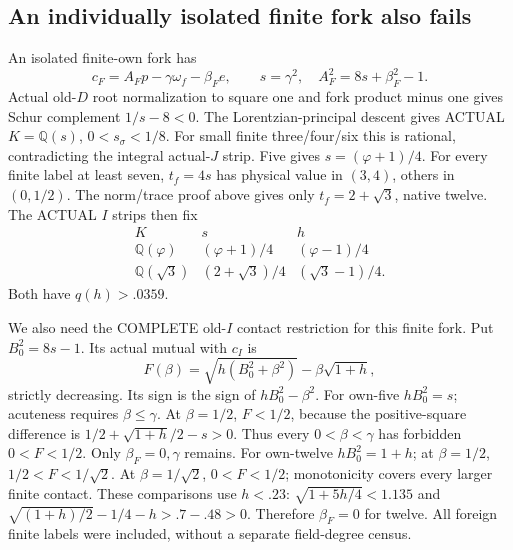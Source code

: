 \subsection{An individually isolated finite fork also fails}
\label{app:arithD16Ifiniteisolated}

An isolated finite-own fork has
\[
       c_F=A_Fp-\gamma\omega_f-\beta_Fe,\qquad
       s=\gamma^2,\quad A_F^2=8s+\beta_F^2-1 .
\]
Actual old-\(D\) root normalization
to square one and fork product minus
one gives Schur complement \(1/s-8<0\).
The Lorentzian-principal descent gives
ACTUAL \(K=\mathbb Q(s)\),
\(0<s_\sigma<1/8\).
For small finite three/four/six this
is rational, contradicting the integral
actual-\(J\) strip.
Five gives \(s=(\varphi+1)/4\).
For every finite label at least seven,
\(t_f=4s\) has physical value in
\((3,4)\), others in \((0,1/2)\).
The norm/trace proof above gives only
\(t_f=2+\sqrt3\), native twelve.
The ACTUAL \(I\) strips then fix
\[
\begin{array}{c|c|c}
 K&s&h\\ \hline
 \mathbb Q(\varphi)&(\varphi+1)/4&(\varphi-1)/4\\
 \mathbb Q(\sqrt3)&(2+\sqrt3)/4&(\sqrt3-1)/4 .
\end{array}
\]
Both have \(q(h)>.0359\).

We also need the COMPLETE old-\(I\)
contact restriction for this finite fork.
Put \(B_0^2=8s-1\).
Its actual mutual with \(c_I\) is
\[
                 F(\beta)=\sqrt{h(B_0^2+\beta^2)}
                                          -\beta\sqrt{1+h},
\]
strictly decreasing.
Its sign is the sign of
\(hB_0^2-\beta^2\).
For own-five \(hB_0^2=s\);
acuteness requires \(\beta\le\gamma\).
At \(\beta=1/2\),
\(F<1/2\), because the positive-square
difference is
\(1/2+\sqrt{1+h}/2-s>0\).
Thus every \(0<\beta<\gamma\) has
forbidden \(0<F<1/2\).
Only \(\beta_F=0,\gamma\) remains.
For own-twelve \(hB_0^2=1+h\);
at \(\beta=1/2\), \(1/2<F<1/\sqrt2\).
At \(\beta=1/\sqrt2\), \(0<F<1/2\);
monotonicity covers every larger finite
contact.
These comparisons use \(h<.23\):
\(\sqrt{1+5h/4}<1.135\) and
\(\sqrt{(1+h)/2}-1/4-h>.7-.48>0\).
Therefore \(\beta_F=0\) for twelve.
All foreign finite labels were included,
without a separate field-degree census.

